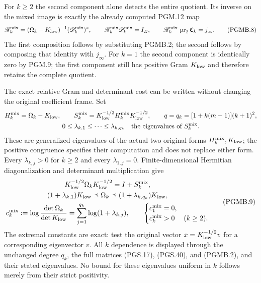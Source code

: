 For $k\geq2$ the second component alone detects the entire
quotient. Its inverse on the mixed image is exactly the
already computed PGM.12 map
\[
 \mathscr R_k^{\rm mix}
 = (\Omega_k-K_{\rm low})^{-1}(\mathscr D_k^{\rm mix})^*,
 \qquad
 \mathscr R_k^{\rm mix}\mathscr D_k^{\rm mix}=I_E,
 \qquad
 \mathscr R_k^{\rm mix}\,\operatorname{pr}_2\mathfrak C_k
                                  =j_\infty.
 \tag{PGMB.8}\label{GraphV2:eq:pgmb-mixed-inverse-composite}
\]
The first composition follows by substituting PGMB.2; the
second follows by composing that identity with $j_\infty$.
For $k=1$ the second component is identically zero by PGM.9;
the first component still has positive Gram $K_{\rm low}$
and therefore retains the complete quotient.

The exact relative Gram and determinant cost can be written
without changing the original coefficient frame. Set
\[
 \begin{gathered}
 H_k^{\rm mix}=\Omega_k-K_{\rm low},\qquad
 S_k^{\rm mix}=K_{\rm low}^{-1/2}H_k^{\rm mix}K_{\rm low}^{-1/2},\qquad
 q=q_k=[1+k(m-1)](k+1)^2,\\
 0\leq\lambda_{k,1}\leq\cdots\leq\lambda_{k,q_k}
       \quad\hbox{the eigenvalues of }S_k^{\rm mix}.
 \end{gathered}
\]
These are generalized eigenvalues of the actual two original
forms $H_k^{\rm mix},K_{\rm low}$; the positive congruence
specifies their computation and does not replace either form.
Every $\lambda_{k,j}>0$ for $k\geq2$ and every
$\lambda_{1,j}=0$. Finite-dimensional Hermitian diagonalization
and determinant multiplication give
\[
 \begin{gathered}
 K_{\rm low}^{-1/2}\Omega_kK_{\rm low}^{-1/2}
                                     =I+S_k^{\rm mix},\\
 (1+\lambda_{k,1})K_{\rm low}\preceq\Omega_k
             \preceq(1+\lambda_{k,q_k})K_{\rm low},\\
 c_k^{\rm mix}:=\log\frac{\det\Omega_k}{\det K_{\rm low}}
       =\sum_{j=1}^{q_k}\log(1+\lambda_{k,j}),\qquad
 \begin{cases}c_1^{\rm mix}=0,\\c_k^{\rm mix}>0& (k\geq2).
 \end{cases}
 \end{gathered}
 \tag{PGMB.9}\label{GraphV2:eq:pgmb-relative-cost}
\]
The extremal constants are exact: test the original vector
$x=K_{\rm low}^{-1/2}v$ for a corresponding eigenvector $v$.
All $k$ dependence is displayed through the unchanged degree
$q_k$, the full matrices (PGS.17), (PGS.40), and (PGMB.2),
and their stated eigenvalues. No bound for these eigenvalues
uniform in $k$ follows merely from their strict positivity.

